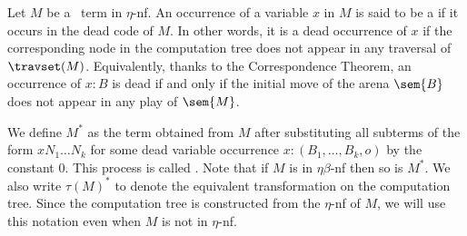 Let $M$  be a \pcf\ term in $\eta$-nf. An occurrence of a variable
$x$ in $M$ is said to be a  if it occurs in
the dead code of $M$. In other words, it is a dead occurrence of $x$
if the corresponding node in the computation tree does not appear in
any traversal of $\travset(M)$. Equivalently, thanks to the
Correspondence Theorem, an occurrence of $x:B$ is dead if and only
if the initial move of the arena $\sem{B}$ does not appear in any
play of $\sem{M}$.


We define $M^*$ as the term obtained from $M$ after substituting all
subterms of the form  $x N_1 \dots N_k$ for some dead variable
occurrence $x:(B_1,\ldots, B_k, o)$ by the constant $0$. This
process is called . Note that if
$M$ is in $\eta\beta$-nf then so is $M^*$. We also write $\tau(M)^*$
to denote the equivalent transformation on the computation tree.
Since the computation tree is constructed from the $\eta$-nf of $M$,
we will use this notation even when $M$ is not in $\eta$-nf.



